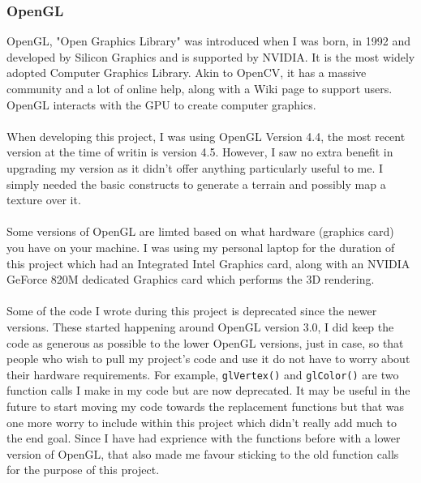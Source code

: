 \documentclass[11pt]{article}
\begin{document}
\subsubsection{OpenGL}
OpenGL, "Open Graphics Library" was introduced when I was born, in 1992 and
developed by Silicon Graphics and is supported by NVIDIA. 
It is the most widely adopted Computer Graphics Library. Akin to OpenCV, it
has a massive community and a lot of online help, along with a Wiki page to
support users. OpenGL interacts with the GPU to create computer graphics.\\
\\
When developing this project, I was using OpenGL Version 4.4, the most
recent version at the time of writin is version 4.5. However, I saw
no extra benefit in upgrading my version as it didn't offer anything
particularly useful to me. I simply needed the basic constructs
to generate a terrain and possibly map a texture over it.\\
\\
Some versions of OpenGL are limted based on what hardware (graphics card)
you have on your machine. I was using my personal laptop for the 
duration of this project which had an Integrated Intel Graphics card, along
with an NVIDIA GeForce 820M dedicated Graphics card which performs the 3D
rendering.\\
\\
Some of the code I wrote during this project is deprecated since the newer
versions. These started happening around OpenGL version 3.0, I did keep the
code as generous as possible to the lower OpenGL versions, just in case,
so that people who wish to pull my project's code and use it do not
have to worry about their hardware requirements. For example, 
\texttt{glVertex()} and \texttt{glColor()} are two function calls I make in my
code but are now deprecated. It may be useful in the future to start moving
my code towards the replacement functions but that was one more worry
to include within this project which didn't really add much to the 
end goal. Since I have had exprience with the functions before with a lower
version of OpenGL, that also made me favour sticking to the old function 
calls for the purpose of this project.
\end{document}
